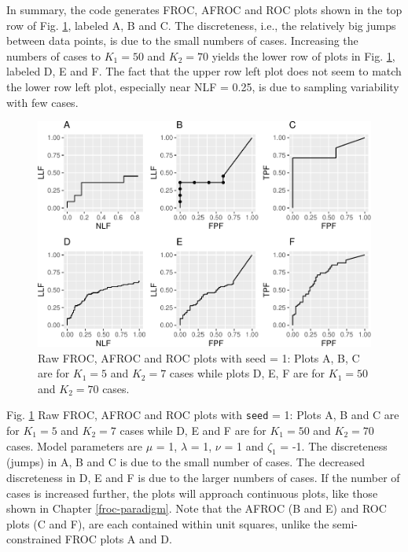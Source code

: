 \documentclass[
]{book}
\begin{document}
In summary, the code generates FROC, AFROC and ROC plots shown in the top row of Fig. \ref{fig:froc-afroc-roc-raw-seed1}, labeled A, B and C. The discreteness, i.e., the relatively big jumps between data points, is due to the small numbers of cases. Increasing the numbers of cases to \(K_1 = 50\) and \(K_2 = 70\) yields the lower row of plots in Fig. \ref{fig:froc-afroc-roc-raw-seed1}, labeled D, E and F. The fact that the upper row left plot does not seem to match the lower row left plot, especially near NLF = 0.25, is due to sampling variability with few cases.

\begin{figure}
\centering
\includegraphics{13b-froc-empirical2_files/figure-latex/froc-afroc-roc-raw-seed1-1.pdf}
\caption{\label{fig:froc-afroc-roc-raw-seed1}Raw FROC, AFROC and ROC plots with seed = 1: Plots A, B, C are for \(K_1 = 5\) and \(K_2 = 7\) cases while plots D, E, F are for \(K_1 = 50\) and \(K_2 = 70\) cases.}
\end{figure}

Fig. \ref{fig:froc-afroc-roc-raw-seed1} Raw FROC, AFROC and ROC plots with \texttt{seed} = 1: Plots A, B and C are for \(K_1 = 5\) and \(K_2 = 7\) cases while D, E and F are for \(K_1 = 50\) and \(K_2 = 70\) cases. Model parameters are \(\mu\) = 1, \(\lambda\) = 1, \(\nu\) = 1 and \(\zeta_1\) = -1. The discreteness (jumps) in A, B and C is due to the small number of cases. The decreased discreteness in D, E and F is due to the larger numbers of cases. If the number of cases is increased further, the plots will approach continuous plots, like those shown in Chapter \ref{froc-paradigm}. Note that the AFROC (B and E) and ROC plots (C and F), are each contained within unit squares, unlike the semi-constrained FROC plots A and D.
\end{document}
